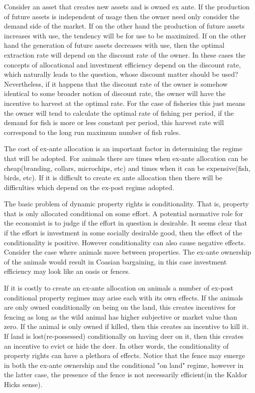 \documentclass[12pt]{article}
\numberwithin{equation}{section}
\begin{document}
Consider an asset that creates new assets and is owned ex ante. If the production of future assets is independent of usage then the owner need only consider the demand side of the market. If on the other hand the production of future assets increases with use, the tendency will be for use to be maximized. If on the other hand the generation of future assets decreases with use, then the optimal extraction rate will depend on the discount rate of the owner. In these cases the concepts of allocational and investment efficiency depend on the discount rate, which naturally leads to the question, whose discount matter should be used? Nevertheless, if it happens that the discount rate of the owner is somehow identical to some broader notion of discount rate, the owner will have the incentive to harvest at the optimal rate. For the case of fisheries this just means the owner will tend to calculate the optimal rate of fishing per period, if the demand for fish is more or less constant per period, this harvest rate will correspond to the long run maximum number of fish rules.

The cost of ex-ante allocation is an important factor in determining the regime that will be adopted. For animals there are times when ex-ante allocation can be cheap(branding, collars, microchips, etc) and times when it can be expensive(fish, birds, etc). If it is difficult to create ex ante allocation then there will be difficulties which depend on the ex-post regime adopted.

The basic problem of dynamic property rights is conditionality. That is, property that is only allocated conditional on some effort. A potential normative role for the economist is to judge if the effort in question is desirable. It seems clear that if the effort is investment in some socially desirable good, then the effect of the conditionality is positive. However conditionality can also cause negative effects. Consider the case where animals move between properties. The ex-ante ownership of the animals would result in Coasian bargaining, in this case investment efficiency may look like an oasis or fences.

If it is costly to create an ex-ante allocation on animals a number of ex-post conditional property regimes may arise each with its own effects. If the animals are only owned conditionally on being on the land, this creates incentives for fencing as long as the wild animal has higher subjective or market value than zero. If the animal is only owned if killed, then this creates an incentive to kill it. If land is lost(re-possessed) conditionally on having deer on it, then this creates an incentive to evict or hide the deer. In other words, the conditionality of property rights can have a plethora of effects. Notice that the fence may emerge in both the ex-ante ownership and the conditional "on land" regime, however in the latter case, the presence of the fence is not necessarily efficient(in the Kaldor Hicks sense).
\end{document}
